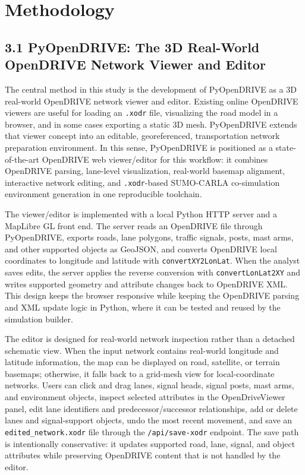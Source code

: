 \documentclass[10pt,numbered]{\selectedmanuscriptclass}
\begin{document}
\section{Methodology}\label{sec:methodology}

\subsection{3.1 PyOpenDRIVE: The 3D Real-World OpenDRIVE Network Viewer and Editor}

The central method in this study is the development of PyOpenDRIVE as a
3D real-world OpenDRIVE network viewer and editor. Existing online OpenDRIVE
viewers are useful for loading an \texttt{.xodr} file, visualizing the road
model in a browser, and in some cases exporting a static 3D mesh. PyOpenDRIVE
extends that viewer concept into an editable, georeferenced, transportation
network preparation environment. In this sense, PyOpenDRIVE is positioned as a
state-of-the-art OpenDRIVE web viewer/editor for this workflow: it combines
OpenDRIVE parsing, lane-level visualization, real-world basemap alignment,
interactive network editing, and \texttt{.xodr}-based SUMO-CARLA
co-simulation environment generation in one reproducible toolchain.

The viewer/editor is implemented with a local Python HTTP server and a MapLibre
GL front end. The server reads an OpenDRIVE file through PyOpenDRIVE, exports
roads, lane polygons, traffic signals, posts, mast arms, and other supported
objects as GeoJSON, and converts OpenDRIVE local coordinates to longitude and
latitude with \texttt{convertXY2LonLat}. When the analyst saves edits, the
server applies the reverse conversion with \texttt{convertLonLat2XY} and writes
supported geometry and attribute changes back to OpenDRIVE XML. This design
keeps the browser responsive while keeping the OpenDRIVE parsing and XML update
logic in Python, where it can be tested and reused by the simulation builder.

The editor is designed for real-world network inspection rather than a detached
schematic view. When the input network contains real-world longitude and
latitude information, the map can be displayed on road, satellite, or terrain
basemaps; otherwise, it falls back to a grid-mesh view for local-coordinate
networks. Users can click and drag lanes, signal heads, signal posts, mast arms,
and environment objects, inspect selected attributes in the OpenDriveViewer
panel, edit lane identifiers and predecessor/successor relationships, add or
delete lanes and signal-support objects, undo the most recent movement, and save
an \texttt{edited\_network.xodr} file through the \texttt{/api/save-xodr}
endpoint. The save path is intentionally conservative: it updates supported
road, lane, signal, and object attributes while preserving OpenDRIVE content
that is not handled by the editor.
\end{document}
